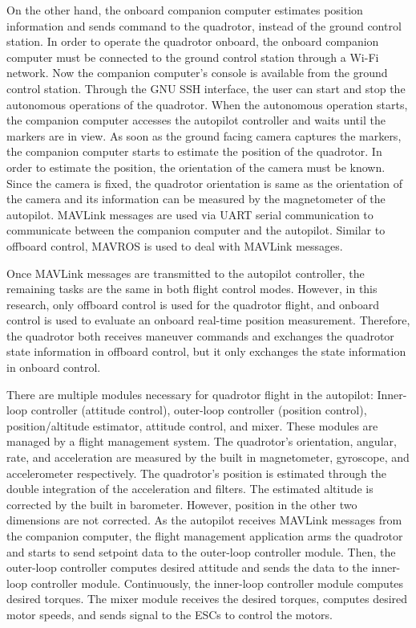 On the other hand, the onboard companion computer estimates position information and sends command to the quadrotor, instead of the ground control station. In order to operate the quadrotor onboard, the onboard companion computer must be connected to the ground control station through a Wi-Fi network. Now the companion computer's console is available from the ground control station. Through the GNU SSH interface, the user can start and stop the autonomous operations of the quadrotor. When the autonomous operation starts, the companion computer accesses the autopilot controller and waits until the markers are in view. As soon as the ground facing camera captures the markers, the companion computer starts to estimate the position of the quadrotor. In order to estimate the position, the orientation of the camera must be known. Since the camera is fixed, the quadrotor orientation is same as the orientation of the camera and its information can be measured by the magnetometer of the autopilot. MAVLink messages are used via UART serial communication to communicate between the companion computer and the autopilot. Similar to offboard control, MAVROS is used to deal with MAVLink messages.
	
Once MAVLink messages are transmitted to the autopilot controller, the remaining tasks are the same in both flight control modes. However, in this research, only offboard control is used for the quadrotor flight, and onboard control is used to evaluate an onboard real-time position measurement. Therefore, the quadrotor both receives maneuver commands and exchanges the quadrotor state information in offboard control, but it only exchanges the state information in onboard control.

	There are multiple modules necessary for quadrotor flight in the autopilot: Inner-loop controller (attitude control), outer-loop controller (position control), position/altitude estimator, attitude control, and mixer. These modules are managed by a flight management system. The quadrotor's orientation, angular, rate, and acceleration are measured by the built in magnetometer, gyroscope, and accelerometer respectively. The quadrotor's position is estimated through the double integration of the acceleration and filters. The estimated altitude is corrected by the built in barometer. However, position in the other two dimensions are not corrected. As the autopilot receives MAVLink messages from the companion computer, the flight management application arms the quadrotor and starts to send setpoint data to the outer-loop controller module. Then, the outer-loop controller computes desired attitude and sends the data to the inner-loop controller module. Continuously, the inner-loop controller module computes desired torques. The mixer module receives the desired torques, computes desired motor speeds, and sends signal to the ESCs to control the motors.
	
